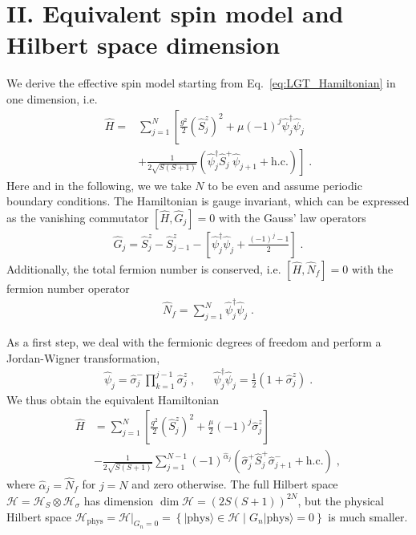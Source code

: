 \documentclass[aps,prl,reprint,twocolumn,superscriptaddress,floatfix,nofootinbib]{revtex4-1}
\begin{document}
\section{II. Equivalent spin model and Hilbert space dimension}
We derive the effective spin model starting from Eq.~{\eqref{eq:LGT_Hamiltonian}} in one dimension, i.e.
\begin{align}
	\hat{H} = &\sum_{j=1}^{N}  \left[ \frac{g^2}{2} (\hat{S}^{z}_{j})^2 + \mu (-1)^j \hat{\psi}_j^\dagger \hat{\psi}_j  \right. \\
	&+ \left. \frac{1}{2\sqrt{S(S+1)}} \left(\hat{\psi}_j^\dagger \hat{S}^+_{j} \hat{\psi}_{j+1} + \text{h.c.}\right) \right]\; .
\end{align}
Here and in the following, we  we take $N$ to be even and assume periodic boundary conditions.
The Hamiltonian is gauge invariant, which can be expressed as the vanishing commutator $\left[\hat{H}, \hat{G}_j\right] = 0$ with the Gauss' law operators
\begin{align}
	\hat{G}_j = \hat{S}^z_{j} - \hat{S}^z_{j-1} - \left[\hat{\psi}_j^\dagger \hat{\psi}_j + \frac{(-1)^j-1}{2}\right]\;.
\end{align}
Additionally, the total fermion number is conserved,  i.e. $\left[\hat{H},\hat{N}_f\right] = 0$ with the fermion number operator  \begin{align}
	\hat{N}_f = \sum_{j=1}^{N} \hat{\psi}_j^\dagger \hat{\psi}_j \;.
\end{align}

As a first step, we deal with the fermionic degrees of freedom and perform  a Jordan-Wigner transformation,
\begin{align}
	\hat{\psi}_j = \hat{\sigma}^-_{j} \prod_{k=1}^{j-1} \hat{\sigma}^z_{j} \;, 
	&& \hat{\psi}_j^\dagger \hat{\psi}_j = \frac{1}{2} \left(1 + \hat{\sigma}^z_{j}\right) \;.
\end{align}
We thus obtain the equivalent Hamiltonian
\begin{align}
	\hat{H} &= \sum_{j=1}^{N} \left[ \frac{g^2}{2} (\hat{S}^{z}_{j})^2 + \frac{\mu}{2} (-1)^j \hat{\sigma}^z_{j} \right]\\
	&- \frac{1}{2\sqrt{S(S+1)}} \sum_{j=1}^{N-1}  (-1)^{\hat{\alpha}_j}   \left(\hat{\sigma}^+_{j} \hat{S}^+_{j} \hat{\sigma}^-_{j+1} + \text{h.c.}\right)\;,\nonumber
\end{align}
where $\hat{\alpha}_j= \hat{N}_f$ for $j = N$ and zero otherwise.
The full Hilbert space $\mathcal{H} = \mathcal{H}_S \otimes \mathcal{H}_\sigma$ has dimension $\dim \mathcal{H} = (2S(S+1))^{2N}$, but the physical Hilbert space $\mathcal{H}_\text{phys} = \mathcal{H} |_{G_n=0} = \left\lbrace |\text{phys} \rangle \in \mathcal{H} \;  | \; G_n |\text{phys} \rangle = 0  \right\rbrace $ is much smaller.
\end{document}
